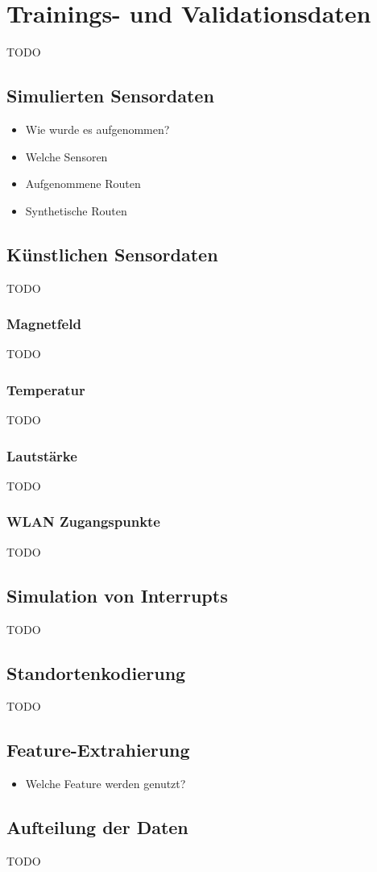 \chapter{Trainings- und Validationsdaten}
TODO

\section{Simulierten Sensordaten}
\begin{itemize}
    \item Wie wurde es aufgenommen?
    \item Welche Sensoren
    \item Aufgenommene Routen
    \item Synthetische Routen
\end{itemize}

\section{Künstlichen Sensordaten}
TODO

\subsection{Magnetfeld}
TODO

\subsection{Temperatur}
TODO

\subsection{Lautstärke}
TODO

\subsection{WLAN Zugangspunkte}
TODO

\section{Simulation von Interrupts}
TODO

\section{Standortenkodierung}
TODO

\section{Feature-Extrahierung}
\begin{itemize}
    \item Welche Feature werden genutzt?
\end{itemize}

\section{Aufteilung der Daten}
TODO